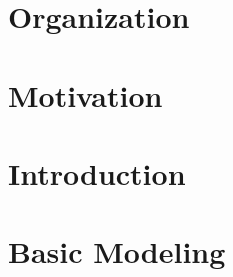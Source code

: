 \documentclass{article}
\begin{document}
\section{Organization}

\begin{refsection}
  \nocite{baral02a}
  \nocite{gekakasc12a}
  \nocite{gelkah14a}
  \nocite{lifschitz19a}
  \nocite{martru93a}
  \nocite{lifschitz04a}
  \nocite{gelfond08a}
  \nocite{eiiakr09a}
  \nocite{breitr11a}
  \nocite{kascwa17a}
  \nocite{schwol18b}
  \nocite{breitr16a}
  \nocite{schwol18a}
  \nocite{gellif88b}
  \nocite{gellif90a}
  \nocite{bargel94a}
  \nocite{niemela99a}
  \nocite{martru99a}
  \nocite{lifschitz02a}
  \nocite{gelleo02a}
  \nocite{gehakalisc15a}
  \nocite{PotasscoUserGuide}
  \nocite{gekakasc17a}
  \nocite{dlv03a,alcadofuleperiveza17a}
  \nocite{syrjanen01a}
  \nocite{gescth07a,gekaosscth09a}
  \nocite{cafupeza17a}
  \nocite{niesim96a,siniso02a}
  \nocite{gekanesc07a,gekasc09c}
  \nocite{aldofaleri13a}
  \nocite{boansctr04a}
  \nocite{contest07a,contest09a,contest11a,contest13a,cagemari14a}
  \printbibliography[heading=subbibliography]
\end{refsection}

\section{Motivation}

\begin{refsection}
  \nocite{gekakasc12a}
  \nocite{heyting30a,goedel32a}
  \printbibliography[heading=subbibliography]
\end{refsection}

\section{Introduction}

\begin{refsection}
  \nocite{gellif90a}
  \nocite{lifraz04a}
  \nocite{lifschitz08a,lifschitz10a}
  \printbibliography[heading=subbibliography]
\end{refsection}

\section{Basic Modeling}

\begin{refsection}
  \nocite{gekakasc12a}
  \printbibliography[heading=subbibliography]
\end{refsection}
\end{document}
